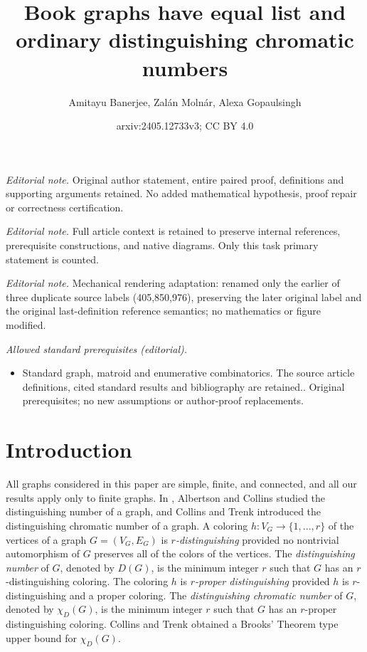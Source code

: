 \documentclass[12pt,reqno,a4paper]{amsart}
\title{Book graphs have equal list and ordinary distinguishing chromatic numbers}
\author{Amitayu Banerjee, Zalán Molnár, Alexa Gopaulsingh}
\date{arxiv:2405.12733v3; CC BY 4.0}
\theoremstyle{definition}
\begin{document}
\maketitle
\noindent\textit{Editorial note.} Original author statement, entire paired proof, definitions and supporting arguments retained. No added mathematical hypothesis, proof repair or correctness certification.\par\medskip
\noindent\textit{Editorial note.} Full article context is retained to preserve internal references, prerequisite constructions, and native diagrams. Only this task primary statement is counted.\par\medskip
\noindent\textit{Editorial note.} Mechanical rendering adaptation: renamed only the earlier of three duplicate source labels (405,850,976), preserving the later original label and the original last-definition reference semantics; no mathematics or figure modified.\par\medskip
\noindent\textit{Allowed standard prerequisites (editorial).}\begin{itemize}
\item Standard graph, matroid and enumerative combinatorics. The source article definitions, cited standard results and bibliography are retained.. Original prerequisites; no new assumptions or author-proof replacements.
\end{itemize}\medskip
\section{Introduction}
All graphs considered in this paper are simple, finite, and connected, and all our results apply only to finite graphs. In \cite{AC1996}, Albertson and Collins studied the distinguishing number of a graph, and Collins and Trenk \cite{CT2006} introduced the distinguishing chromatic number of a graph. 
A coloring $h:V_{G}\rightarrow\{1,...,r\}$ of the vertices of a graph $G=(V_{G}, E_{G})$ is {\em $r$-distinguishing} provided no nontrivial automorphism of $G$ preserves all of the colors of the vertices. The {\em distinguishing number} of $G$, denoted by $D(G)$, is the minimum integer $r$ such that $G$ has an $r$-distinguishing coloring. The coloring $h$ is {\em $r$-proper distinguishing} provided $h$ is $r$-distinguishing and a proper coloring. The {\em distinguishing chromatic number} of $G$, denoted by $\chi_{D}(G)$, is the minimum integer $r$ such that $G$ has an $r$-proper distinguishing coloring.
Collins and Trenk \cite{CT2006} obtained a Brooks' Theorem type upper bound for $\chi_{D}(G)$.
\end{document}

